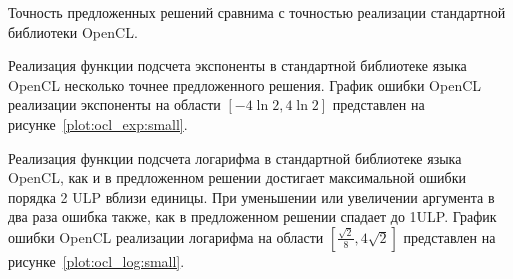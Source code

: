 Точность предложенных решений сравнима с точностью реализации стандартной библиотеки OpenCL.

Реализация функции подсчета экспоненты в стандартной библиотеке языка OpenCL несколько точнее предложенного решения.
График ошибки OpenCL реализации экспоненты на области $[-4\ln{2}, 4\ln{2}]$ представлен на рисунке~\ref{plot:ocl_exp:small}.



Реализация функции подсчета логарифма в стандартной библиотеке языка OpenCL, как и в предложенном решении достигает максимальной ошибки порядка 2 ULP вблизи единицы.
При уменьшении или увеличении аргумента в два раза ошибка также, как в предложенном решении спадает до 1ULP.
График ошибки OpenCL реализации логарифма на области $[\frac{\sqrt{2}}{8}, 4\sqrt{2}]$ представлен на рисунке~\ref{plot:ocl_log:small}.


